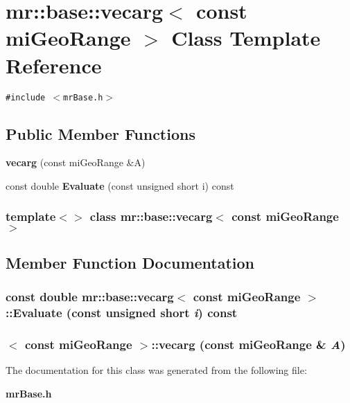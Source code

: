 \section{mr::base::vecarg$<$ const mi\-Geo\-Range $>$ Class Template Reference}
\label{classmr_1_1base_1_1vecarg_3_01const_01miGeoRange_01_4}
{\tt \#include $<$mr\-Base.h$>$}

\subsection*{Public Member Functions}
\begin{CompactItemize}
\item 
{\bf vecarg} (const mi\-Geo\-Range \&A)
\item 
const double {\bf Evaluate} (const unsigned short i) const 
\end{CompactItemize}
\subsubsection*{template$<$$>$ class mr::base::vecarg$<$ const mi\-Geo\-Range $>$}



\subsection{Member Function Documentation}
\subsubsection{\setlength{\rightskip}{0pt plus 5cm}const double {\bf mr::base::vecarg}$<$ const mi\-Geo\-Range $>$::Evaluate (const unsigned short {\em i}) const\hspace{0.3cm}{\tt  [inline]}}\label{classmr_1_1base_1_1vecarg_3_01const_01miGeoRange_01_4_a1}


\subsubsection{$<$ const mi\-Geo\-Range $>$::{\bf vecarg} (const mi\-Geo\-Range \& {\em A})\hspace{0.3cm}{\tt  [inline]}}\label{classmr_1_1base_1_1vecarg_3_01const_01miGeoRange_01_4_a0}




The documentation for this class was generated from the following file:\begin{CompactItemize}
\item 
{\bf mr\-Base.h}\end{CompactItemize}
